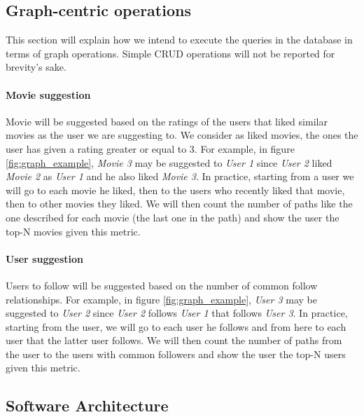 \documentclass[11pt]{article}
\begin{document}
\subsection{Graph-centric operations}
This section will explain how we intend to execute the queries in the database in terms of graph operations. Simple CRUD operations will not be reported for brevity's sake.

\paragraph{Movie suggestion}
Movie will be suggested based on the ratings of the users that liked similar 
movies as the user we are suggesting to. We consider as liked movies, the ones the user has given a rating greater or equal to 3. For example, in figure \ref{fig:graph_example}, 
\emph{Movie 3} may be suggested to \emph{User 1} since \emph{User 2} liked 
\emph{Movie 2} as \emph{User 1} and he also liked \emph{Movie 3}. 
In practice, starting from a user we will go to each movie he
liked, then to the users who recently liked that movie, then to other movies 
they liked. We will then count the number of paths like the one described 
for each movie (the last one in the path) and show the user the top-N movies 
given this metric.

\paragraph{User suggestion}
Users to follow will be suggested based on the number of common follow 
relationships. For example, in figure \ref{fig:graph_example}, \emph{User 3}
may be suggested to \emph{User 2} since \emph{User 2} follows \emph{User 1}
that follows \emph{User 3}. In practice, starting from the user, we will go to
each user he follows and from here to each user that the latter user follows. 
We will then count the number of paths from the user to the users with common 
followers and show the user the top-N users given this metric.

\subsection{Software Architecture}
\end{document}
